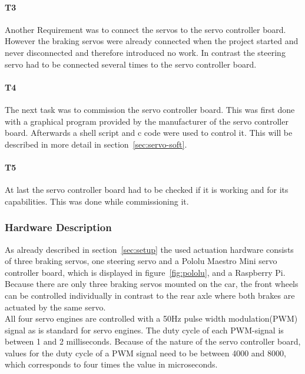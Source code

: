 \paragraph{\textbf{T3}}
Another Requirement was to connect the servos to the servo controller board. However the braking servos were already connected when the project started and never disconnected and therefore introduced no work. In contrast the steering servo had to be connected several times to the servo controller board.

\paragraph{\textbf{T4}}
The next task was to commission the servo controller board. This was first done with a graphical program provided by the manufacturer of the servo controller board. Afterwards a shell script and c code were used to control it. This will be described in more detail in section~\ref{sec:servo-soft}.

\paragraph{\textbf{T5}}
At last the servo controller board had to be checked if it is working and for its capabilities. This was done while commissioning it.

\subsubsection{Hardware Description}
\label{sec:servo-hard}
As already described in section~\ref{sec:setup} the used actuation hardware consists of three braking servos, one steering servo and a Pololu Maestro Mini servo controller board, which is displayed in figure~\ref{fig:pololu}, and a Raspberry Pi. Because there are only three braking servos mounted on the car, the front wheels can be controlled individually in contrast to the rear axle where both brakes are actuated by the same servo.\\

All four servo engines are controlled with a 50Hz pulse width modulation(PWM) signal as is standard for servo engines. The duty cycle of each PWM-signal is between 1 and 2 milliseconds. Because of the nature of the servo controller board, values for the duty cycle of a PWM signal need to be between 4000 and 8000, which corresponds to four times the value in microseconds.\\

